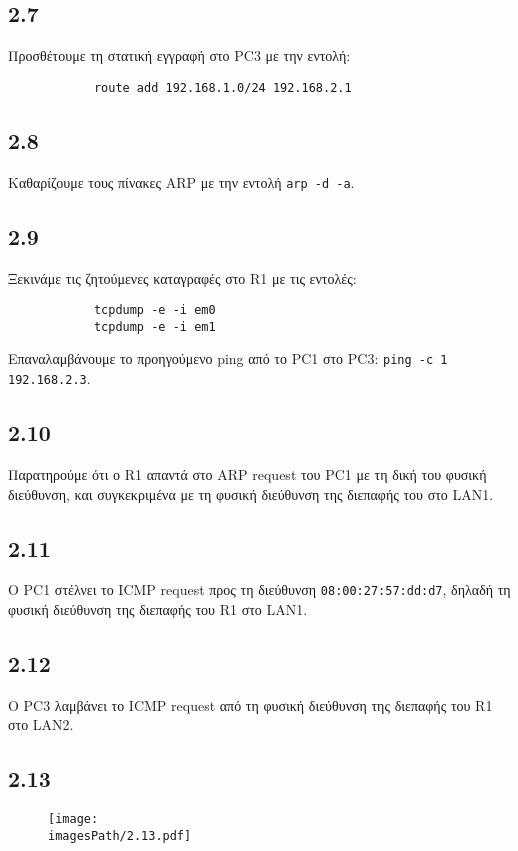 \documentclass[a4paper, 12pt]{article}
\newcommand{\imagesPath}{.}
\begin{document}
	\subsection*{2.7}
		Προσθέτουμε τη στατική εγγραφή στο PC3 με την εντολή:
		
		\begin{verbatim}
			route add 192.168.1.0/24 192.168.2.1
		\end{verbatim}

	\subsection*{2.8}
		Καθαρίζουμε τους πίνακες ARP με την εντολή \verb|arp -d -a|.

	\subsection*{2.9}
		Ξεκινάμε τις ζητούμενες καταγραφές στο R1 με τις εντολές: 
		
		\begin{verbatim}
			tcpdump -e -i em0
			tcpdump -e -i em1
		\end{verbatim}
		
		Επαναλαμβάνουμε το προηγούμενο ping από το PC1 στο PC3: \verb|ping -c 1 192.168.2.3|.

	\subsection*{2.10}
		Παρατηρούμε ότι ο R1 απαντά στο ARP request του PC1 με τη δική του φυσική διεύθυνση, και συγκεκριμένα με τη φυσική διεύθυνση της διεπαφής του στο LAN1.

	\subsection*{2.11}
		Ο PC1 στέλνει το ICMP request προς τη διεύθυνση \verb|08:00:27:57:dd:d7|, δηλαδή τη φυσική διεύθυνση της διεπαφής του R1 στο LAN1.

	\subsection*{2.12}
		Ο PC3 λαμβάνει το ICMP request από τη φυσική διεύθυνση της διεπαφής του R1 στο LAN2.

	\subsection*{2.13} 
		\begin{figure}[H]
			\texttt{[image: \\imagesPath/2.13.pdf]}
		\end{figure}
		
\end{document}
